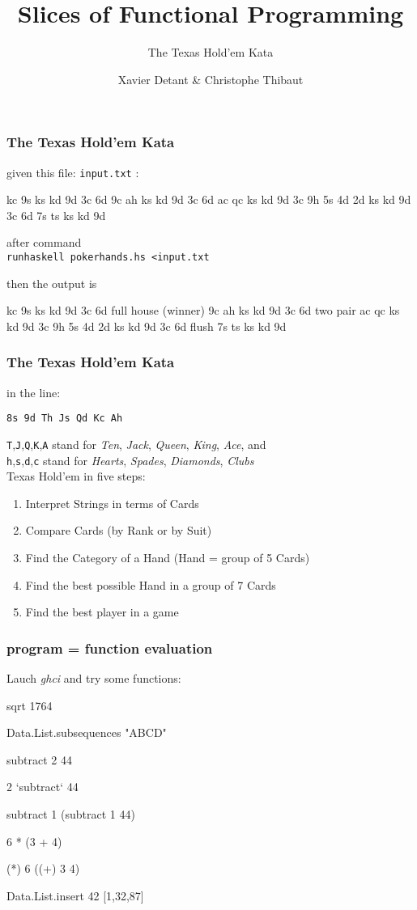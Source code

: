 \documentclass[11pt,xcolor={dvipsnames}]{beamer}
\newcommand{\tc}{\textcolor}
\newcommand{\key}[1]{\tc{orange}{#1}}
\newcommand{\rk}{\enskip{\key{$\hookleftarrow$}}}
\newcommand{\vs}{\vspace{1em}}
\begin{document}
\title{Slices of Functional Programming}
\subtitle{The Texas Hold'em Kata}
\author{Xavier Detant \& Christophe Thibaut}
\begin{frame}
\titlepage
\end{frame}
\begin{frame}[fragile]
\frametitle{The Texas Hold'em Kata}
given this file: \texttt{input.txt} :
\begin{term}
    kc 9s ks kd 9d 3c 6d 
    9c ah ks kd 9d 3c 6d
    ac qc ks kd 9d 3c 
    9h 5s 
    4d 2d ks kd 9d 3c 6d
    7s ts ks kd 9d
\end{term}
after command\\ \texttt{runhaskell pokerhands.hs <input.txt}

then the output is
\begin{term}
    kc 9s ks kd 9d 3c 6d full house (winner)
    9c ah ks kd 9d 3c 6d two pair
    ac qc ks kd 9d 3c 
    9h 5s 
    4d 2d ks kd 9d 3c 6d flush
    7s ts ks kd 9d
\end{term}
\end{frame}
\begin{frame}[fragile]
\frametitle{The Texas Hold'em Kata}

in the line:\\
\begin{center}
\texttt{8s 9d Th Js Qd Kc Ah}
\end{center}
\texttt{T},\texttt{J},\texttt{Q},\texttt{K},\texttt{A} stand for \emph{Ten}, \emph{Jack}, \emph{Queen}, \emph{King}, \emph{Ace}, and\\
\texttt{h},\texttt{s},\texttt{d},\texttt{c} stand for \emph{Hearts}, \emph{Spades}, \emph{Diamonds}, \emph{Clubs}\\
\vs
Texas Hold'em in five steps:
\begin{enumerate}
\item Interpret Strings in terms of Cards
\item Compare Cards (by Rank or by Suit)
\item Find the Category of a Hand (Hand = group of 5 Cards)
\item Find the best possible Hand in a group of 7 Cards
\item Find the best player in a game
\end{enumerate}
\end{frame}
\begin{frame}[fragile]
\frametitle{program = function evaluation}
Lauch \emph{ghci} and try some functions:
\begin{term}
sqrt 1764\rk

Data.List.subsequences "ABCD"\rk

subtract 2 44\rk

 2 `subtract` 44\rk

subtract 1 (subtract 1 44)\rk

6 * (3 + 4)\rk

(*) 6 ((+) 3 4)\rk

Data.List.insert 42 [1,32,87]\rk
\end{term}
\end{frame}
\end{document}
